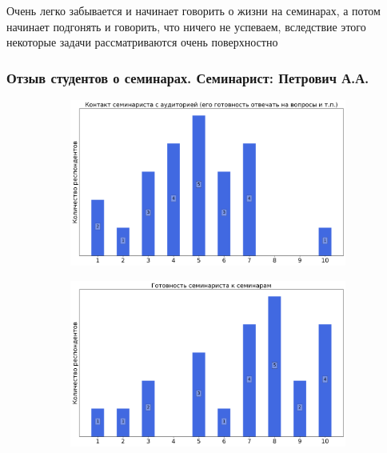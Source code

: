             \begin{commentbox} 
                Очень легко забывается и начинает говорить о жизни на семинарах, а потом начинает подгонять и говорить, что ничего не успеваем, вследствие этого некоторые задачи рассматриваются очень поверхностно 
            \end{commentbox}

    \subsubsection{Отзыв студентов о семинарах. Семинарист: Петрович А.А.}
        \begin{figure}[H]
            \centering
            \begin{subfigure}[b]{0.45\textwidth}
                \centering
                \includegraphics[width=\textwidth]{images/1 course/Аналитическая геометрия/seminarists-marks-Петрович А.А.-0.png}
            \end{subfigure}
            \begin{subfigure}[b]{0.45\textwidth}
                \centering
                \includegraphics[width=\textwidth]{images/1 course/Аналитическая геометрия/seminarists-marks-Петрович А.А.-1.png}

\end{subfigure}
\end{figure}
